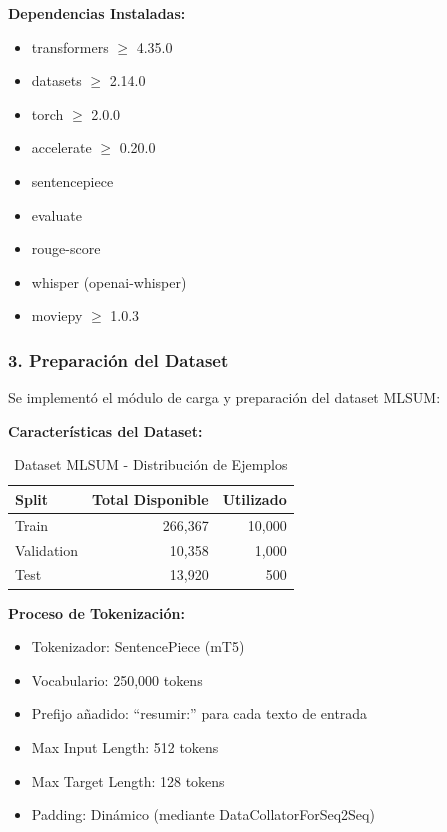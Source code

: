 \documentclass[12pt,a4paper]{article}
\begin{document}
\textbf{Dependencias Instaladas:}
\begin{itemize}
    \item transformers $\geq$ 4.35.0
    \item datasets $\geq$ 2.14.0
    \item torch $\geq$ 2.0.0
    \item accelerate $\geq$ 0.20.0
    \item sentencepiece
    \item evaluate
    \item rouge-score
    \item whisper (openai-whisper)
    \item moviepy $\geq$ 1.0.3
\end{itemize}

\newpage

\subsubsection{3. Preparación del Dataset}

Se implementó el módulo de carga y preparación del dataset MLSUM:

\textbf{Características del Dataset:}
\begin{table}[H]
\centering
\begin{tabular}{lrr}
\toprule
\textbf{Split} & \textbf{Total Disponible} & \textbf{Utilizado} \\
\midrule
Train & 266,367 & 10,000 \\
Validation & 10,358 & 1,000 \\
Test & 13,920 & 500 \\
\bottomrule
\end{tabular}
\caption{Dataset MLSUM - Distribución de Ejemplos}
\label{tab:dataset}
\end{table}

\textbf{Proceso de Tokenización:}
\begin{itemize}
    \item Tokenizador: SentencePiece (mT5)
    \item Vocabulario: 250,000 tokens
    \item Prefijo añadido: ``resumir:'' para cada texto de entrada
    \item Max Input Length: 512 tokens
    \item Max Target Length: 128 tokens
    \item Padding: Dinámico (mediante DataCollatorForSeq2Seq)
\end{itemize}
\end{document}

